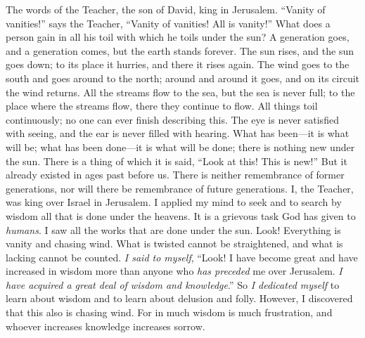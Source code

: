 
\begin{biblechapter} %
 The words of the Teacher, the son of David, king in Jerusalem.
 “Vanity of vanities!” says the Teacher, 
“Vanity of vanities! All is vanity!”
 What does a person gain in all his toil 
with which he toils under the sun?
\verse A generation goes, and a generation comes, 
but the earth stands forever.
\verse The sun rises, and the sun goes down; 
to its place it hurries, and there it rises again.
\verse The wind goes to the south and goes around to the north; 
around and around it goes, and on its circuit the wind returns.
\verse All the streams flow to the sea, 
but the sea is never full; 
to the place where the streams flow, 
there they continue to flow.
\verse All things toil continuously; 
no one can ever finish describing this. 
The eye is never satisfied with seeing, 
and the ear is never filled with hearing.
\verse What has been—it is what will be; 
what has been done—it is what will be done; 
there is nothing new under the sun.
\verse There is a thing of which it is said, “Look at this! This is new!” 
But it already existed in ages past before us.
\verse There is neither remembrance of former generations, 
nor will there be remembrance of future generations.
 I, the Teacher, was king over Israel in Jerusalem.
\verse I applied my mind to seek and to search by wisdom all that is done under the heavens. It is a grievous task God has given to \textit{humans}.
\verse I saw all the works that are done under the sun. Look! Everything is vanity and chasing wind.
\verse What is twisted cannot be straightened, 
and what is lacking cannot be counted.
\verse \textit{I said to myself}, “Look! I have become great and have increased in wisdom more than anyone who \textit{has preceded} me over Jerusalem. \textit{I have acquired a great deal of wisdom and knowledge}.”
\verse So \textit{I dedicated myself} to learn about wisdom and to learn about delusion and folly. However, I discovered that this also is chasing wind.
\verse For in much wisdom is much frustration, 
and whoever increases knowledge increases sorrow.
\end{biblechapter}

